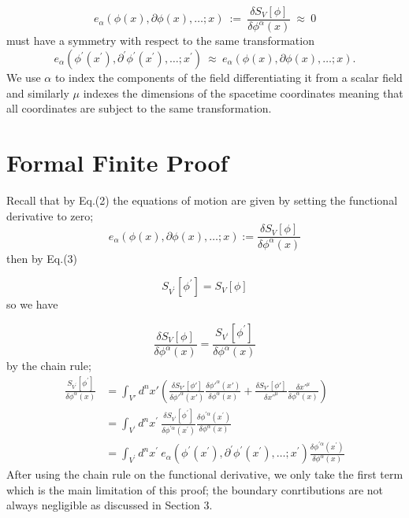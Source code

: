 \documentclass{article}
\begin{document}
\begin{equation}
	e_{\alpha}(\phi(x),\partial\phi(x),\ldots ; x)~:=~\frac{\delta S_V[\phi]}{\delta \phi^{\alpha}(x)}~\approx~0
\end{equation}
must have a symmetry with respect to the same transformation
\begin{equation}
	e_{\alpha}(\phi^{\prime}(x^{\prime}),\partial^{\prime}\phi^{\prime}(x^{\prime}),\ldots ; x^{\prime})~\approx~e_{\alpha}(\phi(x),\partial\phi(x),\ldots ; x).
\end{equation}
We use $\alpha$ to index the components of the field differentiating it from a scalar field and similarly $\mu$ indexes the dimensions of the spacetime coordinates meaning that all coordinates are subject to the same transformation.

\section{Formal Finite Proof}
Recall that by Eq.(2) the equations of motion are given by setting the functional derivative to zero;
\[
	e_{\alpha}(\phi(x),\partial\phi(x),\ldots ; x) := \frac{\delta S_V[\phi]}{\delta \phi^{\alpha}(x)}
\]
then by Eq.(3)

\[
	S_{V^\prime}\left[\phi^\prime\right] = S_V\left[\phi\right]
\]
so we have

\[
	\frac{\delta S_V[\phi]}{\delta \phi^{\alpha}(x)} = \frac{S_{V^\prime}\left[\phi^\prime\right]}{\delta \phi^{\alpha}(x)}
\]
by the chain rule;
\begin{align*}
	\frac{S_{V^\prime}\left[\phi^\prime\right]}{\delta \phi^{\alpha}(x)} &= \int_{V'} d^n x' \left( \frac{\delta S_{V'}[\phi']}{\delta \phi'^\alpha(x')} \frac{\delta \phi'^\alpha(x')}{\delta \phi^\alpha(x)} + \frac{\delta S_{V'}[\phi']}{\delta x'^\mu} \frac{\delta x'^\mu}{\delta \phi^\alpha(x)} \right) \\
									     &= \int_{V^{\prime}}\!d^nx^{\prime}~\frac{\delta S_{V^{\prime}}[\phi^{\prime}]}{\delta \phi^{\prime\alpha}(x^{\prime})} \frac{\delta \phi^{\prime\alpha}(x^{\prime})}{\delta \phi^{\alpha}(x)} \\
									     &=\int_{V^{\prime}}\!d^nx^{\prime}~e_{\alpha}(\phi^{\prime}(x^{\prime}),\partial^{\prime}\phi^{\prime}(x^{\prime}),\ldots ; x^{\prime}) \frac{\delta \phi^{\prime\alpha}(x^{\prime})}{\delta \phi^{\alpha}(x)}
\end{align*}
After using the chain rule on the functional derivative, we only take the first term which is the main limitation of this proof; the boundary conrtibutions are not always negligible as discussed in Section 3.
\end{document}
